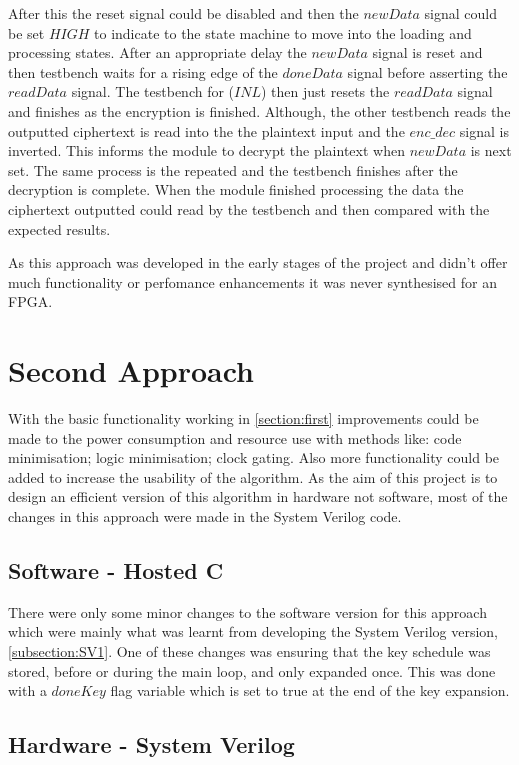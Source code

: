 \documentclass[12pt,twoside,a4paper]{report}
\begin{document}
	After this the reset signal could be disabled and then the $newData$ signal could be set $HIGH$ to indicate to the state machine to move into the loading and processing states. After an appropriate delay the $newData$ signal is reset and then testbench waits for a rising edge of the $doneData$ signal before asserting the $readData$ signal. The testbench for ($INL$) then just resets the $readData$ signal and finishes as the encryption is finished. Although, the other testbench reads the outputted ciphertext is read into the the plaintext input and the $enc\_dec$ signal is inverted. This informs the module to decrypt the plaintext when $newData$ is next set. The same process is the repeated and the testbench finishes after the decryption is complete. When the module finished processing the data the ciphertext outputted could read by the testbench and then compared with the expected results.
	
	As this approach was developed in the early stages of the project and didn't offer much functionality or perfomance enhancements it was never synthesised for an FPGA.
    
	\section{Second Approach}
	\label{section:second}
	With the basic functionality working in \autoref{section:first} improvements could be made to the power consumption and resource use with methods like: code minimisation; logic minimisation; clock gating. Also more functionality could be added to increase the usability of the algorithm. As the aim of this project is to design an efficient version of this algorithm in hardware not software, most of the changes in this approach were made in the System Verilog code.
    
	\subsection{Software - Hosted C}
	\label{subsection:HOSTED2}
	
	There were only some minor changes to the software version for this approach which were mainly what was learnt from developing the System Verilog version, \autoref{subsection:SV1}. One of these changes was ensuring that the key schedule was stored, before or during the main loop, and only expanded once. This was done with a $doneKey$ flag variable which is set to true at the end of the key expansion. 
    
	\subsection{Hardware - System Verilog}
	\label{subsection:SV2}
	
\end{document}
